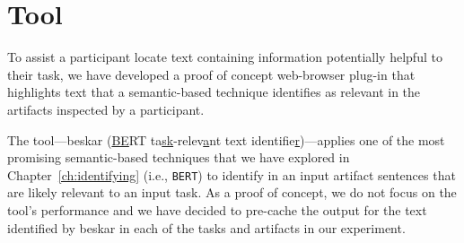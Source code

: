 \section{Tool}
\label{cp6:tool}


To assist a participant locate text containing information potentially helpful to their task, we have developed a proof of concept web-browser plug-in 
that highlights text that a semantic-based technique 
identifies as relevant in the artifacts inspected by a participant.



The tool---\acs{beskar} (\underline{BE}RT ta\underline{sk}-relev\underline{a}nt text identifie\underline{r})---applies 
one of the most promising semantic-based techniques that we have explored in Chapter~\ref{ch:identifying} (i.e., \texttt{BERT})
to identify in an input artifact sentences that are likely relevant to an input task. 
As a proof of concept, we do not focus on the tool's performance
and we have decided to pre-cache the output 
for the text identified by \acs{beskar} in each of the tasks and artifacts 
in our experiment. 






